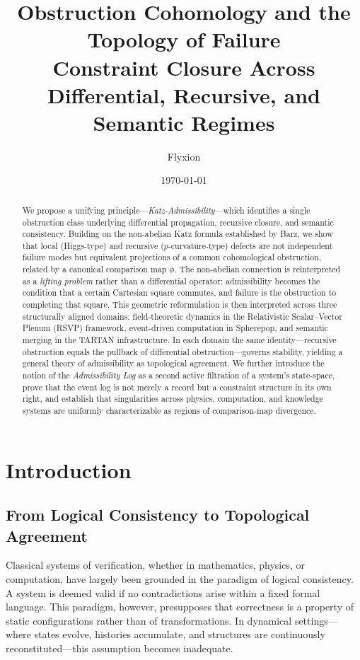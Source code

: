 \documentclass[12pt]{article}
\title{\textbf{Obstruction Cohomology and the Topology of Failure}\\
\large Constraint Closure Across Differential, Recursive, and Semantic Regimes}
\author{Flyxion}
\date{\today}
\begin{document}
\maketitle

\begin{abstract}
We propose a unifying principle---\emph{Katz-Admissibility}---which identifies a single
obstruction class underlying differential propagation, recursive closure, and semantic
consistency. Building on the non-abelian Katz formula established by Barz, we show that
local (Higgs-type) and recursive ($p$-curvature-type) defects are not independent failure
modes but equivalent projections of a common cohomological obstruction, related by a
canonical comparison map $\phi$. The non-abelian connection is reinterpreted as a
\emph{lifting problem} rather than a differential operator: admissibility becomes the
condition that a certain Cartesian square commutes, and failure is the obstruction to
completing that square. This geometric reformulation is then interpreted across three
structurally aligned domains: field-theoretic dynamics in the Relativistic Scalar--Vector
Plenum (RSVP) framework, event-driven computation in Spherepop, and semantic merging in
the TARTAN infrastructure. In each domain the same identity---recursive obstruction equals
the pullback of differential obstruction---governs stability, yielding a general theory of
admissibility as topological agreement. We further introduce the notion of the
\emph{Admissibility Log} as a second active filtration of a system's state-space, prove
that the event log is not merely a record but a constraint structure in its own right, and
establish that singularities across physics, computation, and knowledge systems are
uniformly characterizable as regions of comparison-map divergence.
\end{abstract}

\newpage
\tableofcontents
\newpage

\section{Introduction}

\subsection{From Logical Consistency to Topological Agreement}

Classical systems of verification, whether in mathematics, physics, or computation,
have largely been grounded in the paradigm of logical consistency. A system is deemed
valid if no contradictions arise within a fixed formal language. This paradigm,
however, presupposes that correctness is a property of static configurations rather
than of transformations. In dynamical settings---where states evolve, histories
accumulate, and structures are continuously reconstituted---this assumption becomes
inadequate.
\end{document}
